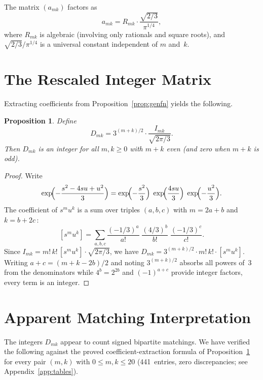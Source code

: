 \documentclass[11pt,a4paper]{article}
\theoremstyle{definition}
\theoremstyle{plain}
\newtheorem{proposition}[definition]{Proposition}
\begin{document}
The matrix $(a_{mk})$ factors as
\begin{equation}\label{eq:factor}
  a_{mk} = R_{mk} \cdot \frac{\sqrt{2/3}}{\pi^{1/4}},
\end{equation}
where $R_{mk}$ is algebraic (involving only rationals and square roots),
and $\sqrt{2/3}/\pi^{1/4}$ is a universal constant independent of $m$
and~$k$.

\section{The Rescaled Integer Matrix}

Extracting coefficients from Proposition~\ref{prop:genfn} yields the
following.

\begin{proposition}\label{prop:Dmk}
Define
\begin{equation}\label{eq:Dmk}
  D_{mk} = 3^{(m+k)/2} \cdot \frac{I_{mk}}{\sqrt{2\pi/3}}.
\end{equation}
Then $D_{mk}$ is an integer for all $m, k \ge 0$ with $m + k$ even
(and zero when $m + k$ is odd).
\end{proposition}

\begin{proof}
Write
\[
  \exp\!\Bigl(-\frac{s^2 - 4su + u^2}{3}\Bigr)
  = \exp\!\Bigl(-\frac{s^2}{3}\Bigr)\;
    \exp\!\Bigl(\frac{4su}{3}\Bigr)\;
    \exp\!\Bigl(-\frac{u^2}{3}\Bigr).
\]
The coefficient of $s^m u^k$ is a sum over triples $(a, b, c)$ with
$m = 2a + b$ and $k = b + 2c\,$:
\[
  [s^m u^k] = \sum_{a,b,c}
  \frac{(-1/3)^a}{a!}\;\frac{(4/3)^b}{b!}\;\frac{(-1/3)^c}{c!}.
\]
Since $I_{mk} = m!\,k!\,[s^m u^k] \cdot \sqrt{2\pi/3}$, we have
$D_{mk} = 3^{(m+k)/2} \cdot m!\,k! \cdot [s^m u^k]$. Writing
$a + c = (m + k - 2b)/2$ and noting $3^{(m+k)/2}$ absorbs all powers
of~$3$ from the denominators while $4^b = 2^{2b}$ and $(-1)^{a+c}$
provide integer factors, every term is an integer.
\end{proof}

\section{Apparent Matching Interpretation}

The integers $D_{mk}$ appear to count signed bipartite matchings. We
have verified the following against the proved coefficient-extraction
formula of Proposition~\ref{prop:Dmk} for every pair $(m,k)$ with
$0 \le m, k \le 20$ (441~entries, zero discrepancies; see
Appendix~\ref{app:tables}).
\end{document}
